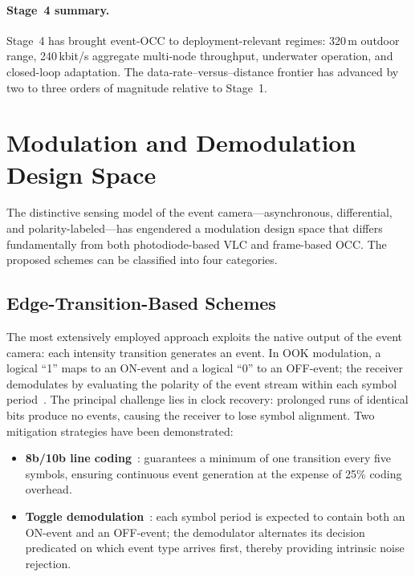 \documentclass[10pt,a4paper]{article}
\begin{document}
\paragraph{Stage~4 summary.}
Stage~4 has brought event-OCC to deployment-relevant regimes:
320\,m outdoor range, 240\,kbit/s aggregate multi-node throughput,
underwater operation, and closed-loop adaptation. The
data-rate--versus--distance frontier has advanced by two to three orders
of magnitude relative to Stage~1.

\section{Modulation and Demodulation Design Space}
\label{sec:modulation}

The distinctive sensing model of the event camera---asynchronous,
differential, and polarity-labeled---has engendered a modulation design
space that differs fundamentally from both photodiode-based VLC and
frame-based OCC. The proposed schemes can be classified into four
categories.

\subsection{Edge-Transition-Based Schemes}
\label{sec:edge}

The most extensively employed approach exploits the native output of the
event camera: each intensity transition generates an event. In OOK
modulation, a logical ``1'' maps to an ON-event and a logical ``0'' to
an OFF-event; the receiver demodulates by evaluating the polarity of the
event stream within each symbol
period~\cite{perez2017eventocc, sumino2025longrange, nardo2026longrange}.
The principal challenge lies in clock recovery: prolonged runs of
identical bits produce no events, causing the receiver to lose symbol
alignment. Two mitigation strategies have been demonstrated:
\begin{itemize}
  \item \textbf{8b/10b line coding}~\cite{nardo2026longrange}: guarantees
    a minimum of one transition every five symbols, ensuring continuous
    event generation at the expense of 25\% coding overhead.
  \item \textbf{Toggle demodulation}~\cite{sumino2025longrange}: each
    symbol period is expected to contain both an ON-event and an
    OFF-event; the demodulator alternates its decision predicated on
    which event type arrives first, thereby providing intrinsic noise
    rejection.
\end{itemize}
\end{document}
